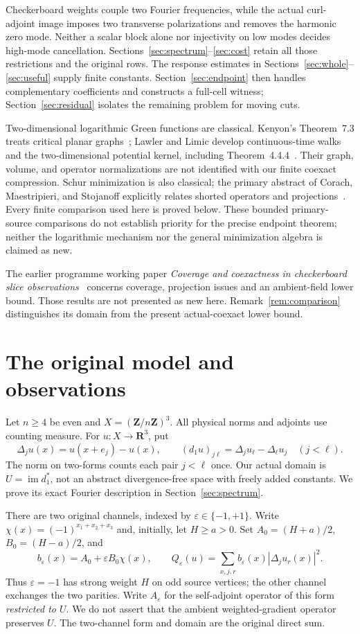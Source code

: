 \documentclass[11pt]{article}
\newcommand{\R}{\mathbf R}
\newcommand{\Z}{\mathbf Z}
\DeclareMathOperator{\im}{im}
\theoremstyle{definition}
\theoremstyle{remark}
\begin{document}
Checkerboard weights couple two Fourier frequencies, while the actual
curl-adjoint image imposes two transverse polarizations and removes the
harmonic zero mode. Neither a scalar block alone nor injectivity on low
modes decides high-mode cancellation. Sections~\ref{sec:spectrum}--\ref{sec:cost}
retain all those restrictions and the original rows. The response estimates
in Sections~\ref{sec:whole}--\ref{sec:useful} supply finite constants.
Section~\ref{sec:endpoint} then handles complementary coefficients and
constructs a full-cell witness; Section~\ref{sec:residual} isolates the
remaining problem for moving cuts.

Two-dimensional logarithmic Green functions are classical. Kenyon's
Theorem~7.3 treats critical planar graphs~\cite{Kenyon}; Lawler and Limic
develop continuous-time walks and the two-dimensional potential kernel,
including Theorem~4.4.4~\cite{LawlerLimic}. Their graph, volume, and operator
normalizations are not identified with our finite coexact compression.
Schur minimization is also classical; the primary abstract of Corach,
Maestripieri, and Stojanoff explicitly relates shorted operators and
projections~\cite{Corach}. Every finite comparison used here is proved
below. These bounded primary-source comparisons do not establish priority
for the precise endpoint theorem; neither the logarithmic mechanism nor
the general minimization algebra is claimed as new.

The earlier programme working paper \emph{Coverage and coexactness in
checkerboard slice observations}~\cite{Eriksson274} concerns coverage,
projection issues and an ambient-field lower bound. Those results are not
presented as new here. Remark~\ref{rem:comparison} distinguishes its domain
from the present actual-coexact lower bound.
\section{The original model and observations}\label{sec:model}
Let $n\ge4$ be even and $X=(\Z/n\Z)^3$. All physical norms and adjoints use
counting measure. For $u:X\to\R^3$, put
\[
 \Delta_j u(x)=u(x+e_j)-u(x),\qquad
 (d_1u)_{j\ell}=\Delta_j u_\ell-\Delta_\ell u_j\quad(j<\ell).
\]
The norm on two-forms counts each pair $j<\ell$ once. Our actual domain is
$U=\im d_1^*$, not an abstract divergence-free space with freely added
constants. We prove its exact Fourier description in Section~\ref{sec:spectrum}.

There are two original channels, indexed by $\varepsilon\in\{-1,+1\}$.
Write $\chi(x)=(-1)^{x_1+x_2+x_3}$ and, initially, let $H\ge a>0$.
Set $A_0=(H+a)/2$, $B_0=(H-a)/2$, and
\begin{equation}\label{eq:originalQ}
 b_\varepsilon(x)=A_0+\varepsilon B_0\chi(x),\qquad
 Q_\varepsilon(u)=\sum_{x,j,r}b_\varepsilon(x)|\Delta_j u_r(x)|^2.
\end{equation}
Thus $\varepsilon=-1$ has strong weight $H$ on odd source vertices; the
other channel exchanges the two parities. Write $A_\varepsilon$ for the
self-adjoint operator of this form \emph{restricted to $U$}. We do not
assert that the ambient weighted-gradient operator preserves $U$.
The two-channel form and domain are the original direct sum.
\end{document}

